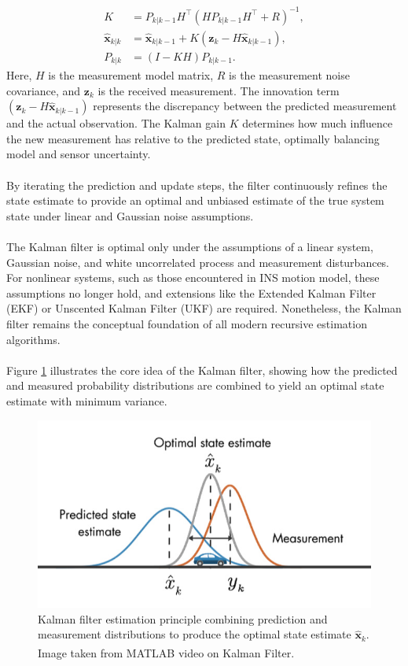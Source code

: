 $$
\begin{aligned}
    K &= P_{k|k-1}H^\top(HP_{k|k-1}H^\top + R)^{-1}, \\
    \hat{\mathbf{x}}_{k|k} &= \hat{\mathbf{x}}_{k|k-1} + K(\mathbf{z}_k - H\hat{\mathbf{x}}_{k|k-1}), \\
    P_{k|k} &= (I - KH)P_{k|k-1}.
\end{aligned}
$$
Here, $H$ is the measurement model matrix, $R$ is the measurement noise covariance, and $\mathbf{z}_k$ is the received measurement. The innovation term $(\mathbf{z}_k - H\hat{\mathbf{x}}_{k|k-1})$ represents the discrepancy between the predicted measurement and the actual observation. The Kalman gain $K$ determines how much influence the new measurement has relative to the predicted state, optimally balancing model and sensor uncertainty.  
\\ \\
By iterating the prediction and update steps, the filter continuously refines the state estimate to provide an optimal and unbiased estimate of the true system state under linear and Gaussian noise assumptions.
\\ \\
The Kalman filter is optimal only under the assumptions of a linear system, Gaussian noise, and white uncorrelated process and measurement disturbances. For nonlinear systems, such as those encountered in INS motion model, these assumptions no longer hold, and extensions like the Extended Kalman Filter (EKF) or Unscented Kalman Filter (UKF) are required. Nonetheless, the Kalman filter remains the conceptual foundation of all modern recursive estimation algorithms.  
\\ \\
Figure \ref{fig:state-estimation-kalman-filter} illustrates the core idea of the Kalman filter, showing how the predicted and measured probability distributions are combined to yield an optimal state estimate with minimum variance.
\begin{figure}[H]
    \centering
    \includegraphics[width=1.0\linewidth]{Pictures/State_Estimation/Kalman_Filter/State_Estimate_Illustrated.jpg}
    \caption{Kalman filter estimation principle combining prediction and measurement distributions to produce the optimal state estimate $\hat{\mathbf{x}}_k$. Image taken from MATLAB video on Kalman Filter.\textsuperscript{\cite{kalman_filter}}}
    \label{fig:state-estimation-kalman-filter}
\end{figure}
